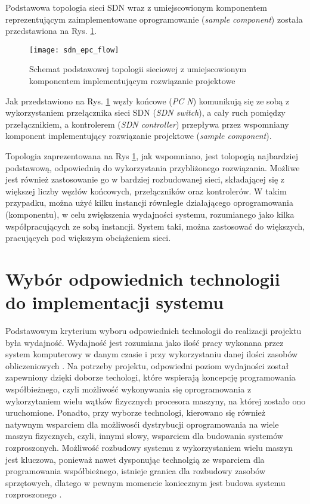 Podstawowa topologia sieci SDN wraz z umiejscowionym komponentem reprezentującym
zaimplementowane oprogramowanie (\textit{sample component}) została
przedstawiona na Rys. \ref{fig:sdn_epc_flow}. 

\begin{figure}[h]
\centering
\texttt{[image: sdn\_epc\_flow]}
\caption{Schemat podstawowej topologii sieciowej z umiejscowionym komponentem
  implementującym rozwiązanie projektowe}
\label{fig:sdn_epc_flow}
\end{figure}

Jak przedstawiono na Rys. \ref{fig:sdn_epc_flow} węzły końcowe
(\textit{PC N}) komunikują się ze sobą z wykorzystaniem przełącznika sieci SDN
(\textit{SDN switch}), a cały ruch pomiędzy przełącznikiem, a kontrolerem
(\textit{SDN controller}) przepływa przez wspomniany komponent implementujący
rozwiązanie projektowe (\textit{sample component}). 

Topologia zaprezentowana na Rys \ref{fig:sdn_epc_flow}, jak wspomniano, jest
tolopogią najbardziej podstawową, odpowiednią do wykorzystania przybliżonego
rozwiązania. Możliwe jest również zastosowanie go w bardziej
rozbudowanej sieci, składającej się z większej liczby węzłów końcowych, 
przełączników oraz kontrolerów. W takim przypadku, można użyć kilku instancji
równlegle działającego oprogramowania (komponentu), w celu zwiększenia
wydajności systemu, rozumianego jako kilka współpracujących ze sobą instancji.
System taki, można zastosować do większych, pracujących pod większym obciążeniem
sieci.

\section{Wybór odpowiednich technologii do implementacji systemu}

Podstawowym kryterium wyboru odpowiednich technologii do realizacji projektu
była wydajność. Wydajność jest rozumiana jako ilość pracy wykonana przez system
komputerowy w danym czasie i przy wykorzystaniu danej ilości zasobów
obliczeniowych \cite{distrforfunandprof}. Na potrzeby projektu, odpowiedni
poziom wydajności został zapewniony dzięki doborze techologi, które wspierają
koncepcję programowania współbieżnego, czyli możliwość wykonywania się
oprogramowania z wykorzytaniem wielu wątków fizycznych procesora maszyny, na
której zostało ono uruchomione. Ponadto, przy wyborze technologi, kierowano się
również natywnym wsparciem dla możliwosći dystrybucji oprogramowania na wiele
maszyn fizycznych, czyli, innymi słowy, wsparciem dla budowania systemów
rozproszonych. Możliwość rozbudowy systemu z wykorzystaniem wielu maszyn jest
kluczowa, ponieważ nawet dysponując technolgią ze wsparciem dla programowania
współbieżnego, istnieje granica dla rozbudowy zasobów sprzętowych, dlatego w
pewnym momencie koniecznym jest budowa systemu rozproszonego
\cite{distrforfunandprof}. 


